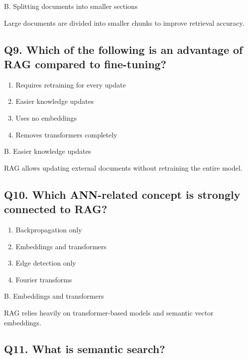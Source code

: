 \documentclass[12pt,a4paper]{article}
\begin{document}
\begin{tcolorbox}[colback=mid,colframe=softblue,title=Correct Answer]
B. Splitting documents into smaller sections

Large documents are divided into smaller chunks to improve retrieval accuracy.
\end{tcolorbox}


\subsection*{Q9. Which of the following is an advantage of RAG compared to fine-tuning?}

\begin{enumerate}[label=\Alph*.]
\item Requires retraining for every update
\item Easier knowledge updates
\item Uses no embeddings
\item Removes transformers completely
\end{enumerate}

\begin{tcolorbox}[colback=mid,colframe=softblue,title=Correct Answer]
B. Easier knowledge updates

RAG allows updating external documents without retraining the entire model.
\end{tcolorbox}


\subsection*{Q10. Which ANN-related concept is strongly connected to RAG?}

\begin{enumerate}[label=\Alph*.]
\item Backpropagation only
\item Embeddings and transformers
\item Edge detection only
\item Fourier transforms
\end{enumerate}

\begin{tcolorbox}[colback=mid,colframe=softblue,title=Correct Answer]
B. Embeddings and transformers

RAG relies heavily on transformer-based models and semantic vector embeddings.
\end{tcolorbox}


\subsection*{Q11. What is semantic search?}
\end{document}

